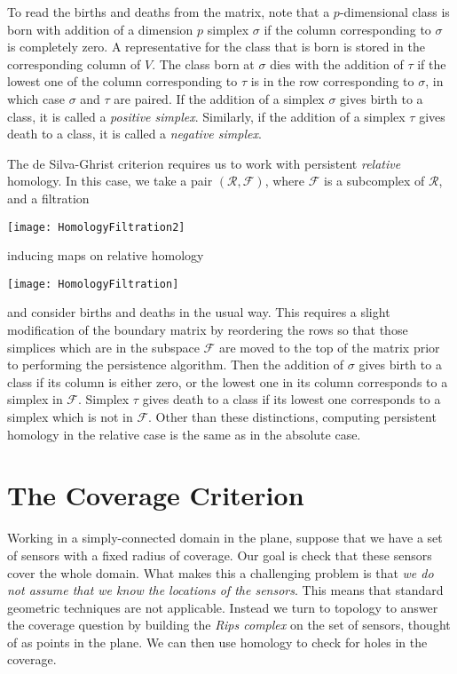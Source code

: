 \documentclass[10pt,twocolumn]{article} \usepackage{amsmath,epsf,amssymb,cite,pifont,amsthm, mathrsfs,epsfig,  bbm, amsthm,  setspace}
\newcommand{\FF}{\mathcal F}
\newcommand{\RR}{\mathcal R}
\renewcommand{\1}{\mathbbm{1}}
\begin{document}
To read the births and deaths from the matrix, note that a $p$-dimensional class is born with addition of a
dimension $p$ simplex $\sigma$ if the column corresponding to $\sigma$ is completely zero.
A representative for the class that is born is stored in the corresponding column of $V$.
The class born at $\sigma$ dies with the addition of $\tau$ if the lowest one of the column corresponding to
$\tau$ is in the row corresponding to $\sigma$,
in which case $\sigma$ and $\tau$ are paired.
If the addition of a simplex $\sigma$ gives birth to a class, it is called a \textit{positive simplex}.
Similarly, if the addition of a simplex $\tau$ gives death to a class, it is called a \textit{negative simplex}.

The de Silva-Ghrist criterion requires us to work with persistent \textit{relative} homology.
In this case, we take a pair $(\RR,\FF)$, where $\FF$ is a subcomplex of $\RR$, and a filtration
\begin{center}
 \texttt{[image: HomologyFiltration2]}
\end{center}
inducing maps on relative homology
\begin{center}
 \texttt{[image: HomologyFiltration]}
\end{center}
and consider births and deaths in the usual way.
This requires a slight modification of the boundary matrix by reordering the rows so that those
simplices which are in the subspace $\FF$ are moved to the top of the matrix prior to performing the persistence algorithm.
Then the addition of $\sigma$ gives birth to a class if its column is either zero,
or the lowest one in its column corresponds to a simplex in $\FF$.
Simplex $\tau$ gives death to a class if its lowest one corresponds to a simplex which is not in $\FF$.
Other than these distinctions, computing persistent homology in the relative case is the same as in the absolute case.


\section{The Coverage Criterion}\label{S: Coverage Criterion}

Working in a simply-connected domain in the plane,
suppose that we have a set of sensors with a fixed radius of coverage.
Our goal is check that these sensors cover the whole domain.
What makes this a challenging problem is that
{\em we do not assume that we know the locations of the sensors}.
This means that standard geometric techniques are not applicable.
Instead we turn to topology to answer the coverage question by building
the {\em Rips complex} on the set of sensors,
thought of as points in the plane.
We can then use homology to check for holes in the coverage.
\end{document}

